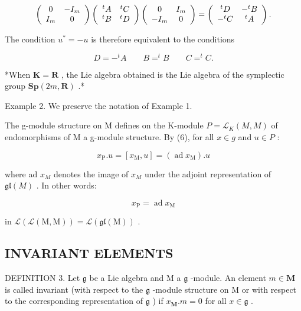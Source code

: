\[
\left( \begin{array}{c c} 0 & - I _ {m} \\ I _ {m} & 0 \end{array} \right) \left( \begin{array}{c c} ^ {t} A & ^ {t} C \\ ^ {t} B & ^ {t} D \end{array} \right) \left( \begin{array}{c c} 0 & I _ {m} \\ - I _ {m} & 0 \end{array} \right) = \left( \begin{array}{c c} ^ {t} D & - ^ {t} B \\ - ^ {t} C & ^ {t} A \end{array} \right).
\]

The condition \(u^{*} = -u\) is therefore equivalent to the conditions

\[
D = - ^ {t} A \qquad B = ^ {t} B \qquad C = ^ {t} C.
\]

*When \(\mathbf{K} = \mathbf{R}\) , the Lie algebra obtained is the Lie algebra of the symplectic group \(\mathbf{Sp}(2m, \mathbf{R})\) .*

Example 2. We preserve the notation of Example 1.

The g-module structure on M defines on the K-module \(P = \mathcal{L}_{K}(M, M)\) of endomorphisms of M a g-module structure. By (6), for all \(x \in g\) and \(u \in P\) :

\[
x _ {\mathrm{P}}. u = \left[ x _ {\mathrm{M}}, u \right] = (\operatorname{ad} x _ {\mathrm{M}}). u\tag{11}
\]

where ad \(x_{M}\) denotes the image of \(x_{M}\) under the adjoint representation of \(\mathfrak{gl}(M)\) . In other words:

\[
x _ {\mathrm{P}} = \operatorname{ad} x _ {\mathrm{M}}\tag{12}
\]

in \(\mathcal{L}(\mathcal{L}(\mathrm{M},\mathrm{M})) = \mathcal{L}(\mathfrak{gl}(\mathrm{M}))\) .

\subsection{INVARIANT ELEMENTS}

DEFINITION 3. Let \(\mathfrak{g}\) be a Lie algebra and M a \(\mathfrak{g}\) -module. An element \(m \in \mathbf{M}\) is called invariant (with respect to the \(\mathfrak{g}\) -module structure on M or with respect to the corresponding representation of \(\mathfrak{g}\) ) if \(x_{\mathbf{M}}.m = 0\) for all \(x \in \mathfrak{g}\) .


